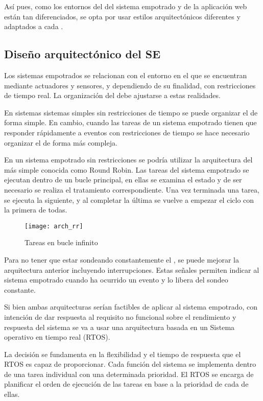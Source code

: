 Así pues, como los entornos del \sw{} del sistema empotrado y de la aplicación
web están tan diferenciados, se opta por usar estilos arquitectónicos diferentes
y adaptados a cada \sw{}.

\subsection{Diseño arquitectónico del SE} \label{sec:arch-se}
Los sistemas empotrados se relacionan con el entorno en el que se encuentran
mediante actuadores y sensores, y dependiendo de su finalidad, con
restricciones de tiempo real. La organización del \sw{} debe ajustarse a estas
realidades.

En sistemas sistemas simples sin restricciones de tiempo se puede organizar
el \sw{} de forma simple. En cambio, cuando las tareas de un sistema empotrado
tienen que responder rápidamente a eventos con restricciones de tiempo se hace
necesario organizar el \sw{} de forma más compleja.

En un sistema empotrado sin restricciones se podría utilizar la arquitectura
del \sw{} más simple conocida como Round Robin. Las tareas del sistema empotrado
se ejecutan dentro de un bucle principal, en ellas se examina el estado \hw{} y
de ser necesario se realiza el tratamiento correspondiente. Una vez terminada
una tarea, se ejecuta la siguiente, y al completar la última se vuelve a empezar
el ciclo con la primera de todas.

\begin{figure}[!h]
  \centering
  \texttt{[image: arch\_rr]}
  \caption{Tareas en bucle infinito} \label{fig:rr}
\end{figure}

Para no tener que estar sondeando constantemente el \hw{}, se puede mejorar la 
arquitectura anterior incluyendo interrupciones. Estas señales permiten indicar
al sistema empotrado cuando ha ocurrido un evento y lo libera del sondeo
constante.

Si bien ambas arquitecturas serían factibles de aplicar al sistema empotrado,
con intención de dar respuesta al requisito no funcional sobre el rendimiento
y respuesta del sistema se va a usar una arquitectura basada en un Sistema
operativo en tiempo real (RTOS).

La decisión se fundamenta en la flexibilidad y el tiempo de respuesta que el
RTOS es capaz de proporcionar. Cada función del sistema se implementa dentro de
una tarea individual con una determinada prioridad. El RTOS se encarga de 
planificar el orden de ejecución de las tareas en base a la prioridad de cada
de ellas. 

